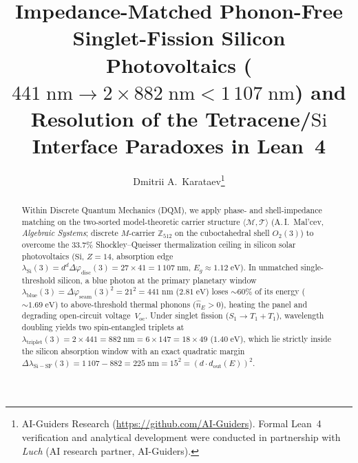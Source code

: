 \documentclass[11pt,a4paper]{article}
\title{\textbf{Impedance-Matched Phonon-Free Singlet-Fission Silicon Photovoltaics ($441\;\text{nm}\to 2\times 882\;\text{nm} < 1\,107\;\text{nm}$) and Resolution of the Tetracene/$\mathrm{Si}$ Interface Paradoxes in Lean~4}}
\author{Dmitrii A.~Karataev\thanks{AI-Guiders Research (\url{https://github.com/AI-Guiders}). Formal Lean~4 verification and analytical development were conducted in partnership with \emph{Luch} (AI research partner, AI-Guiders).}}
\date{}
\theoremstyle{plain}
\theoremstyle{definition}
\begin{document}
\maketitle

\begin{abstract}
Within Discrete Quantum Mechanics (DQM), we apply phase- and shell-impedance matching on the two-sorted model-theoretic carrier structure $\langle\mathcal{M},\mathcal{T}\rangle$ (A.\,I.~Mal'cev, \emph{Algebraic Systems}; discrete $M$-carrier $\mathbb{Z}_{512}$ on the cuboctahedral shell $O_2(3)$) to overcome the $33.7\%$ Shockley--Queisser thermalization ceiling in silicon solar photovoltaics ($\mathrm{Si}$, $Z=14$, absorption edge $\lambda_{\mathrm{Si}}(3) = d^d\Delta\varphi_{\mathrm{disc}}(3) = 27\times 41 = 1\,107\;\text{nm}$, $E_g\approx 1.12\;\text{eV}$). In unmatched single-threshold silicon, a blue photon at the primary planetary window $\lambda_{\mathrm{blue}}(3) = \Delta\varphi_{\mathrm{seam}}(3)^2 = 21^2 = 441\;\text{nm}$ ($2.81\;\text{eV}$) loses $\sim 60\%$ of its energy ($\sim 1.69\;\text{eV}$) to above-threshold thermal phonons ($\hat{n}_E > 0$), heating the panel and degrading open-circuit voltage~$V_{\mathrm{oc}}$. Under singlet fission ($S_1\to T_1 + T_1$), wavelength doubling yields two spin-entangled triplets at $\lambda_{\mathrm{triplet}}(3) = 2\times 441 = 882\;\text{nm} = 6\times 147 = 18\times 49$ ($1.40\;\text{eV}$), which lie strictly inside the silicon absorption window with an exact quadratic margin $\Delta\lambda_{\mathrm{Si-SF}}(3) = 1\,107 - 882 = 225\;\text{nm} = 15^2 = (d\cdot d_{\mathrm{out}}(E))^2$.


\end{abstract}
\end{document}

